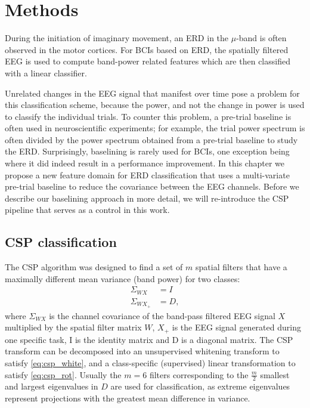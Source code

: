 \section{Methods}
During the initiation of imaginary movement, an \ac{ERD} in the $\mu$-band is
often observed in the motor cortices. For \acp{BCI} based on \ac{ERD}, the
spatially filtered \ac{EEG} is used to compute band-power related features
which are then classified with a linear classifier. 

\begin{sloppypar}
Unrelated changes in the \ac{EEG} signal that manifest over time pose a problem
for this classification scheme, because the power, and not the change in power
is used to classify the individual trials. To counter this problem, a pre-trial
baseline is often used in neuroscientific experiments; for
example, the trial power spectrum is often divided by the power spectrum
obtained from a pre-trial baseline to study the \ac{ERD}. Surprisingly,
baselining is rarely used for \acp{BCI}, one exception being
\cite{kronegg2007ebs} where it did indeed result in a performance improvement.
%
In this chapter we propose a new feature domain for \ac{ERD} classification
that uses a multi-variate pre-trial baseline to reduce the covariance between
the \ac{EEG} channels. Before we describe our baselining approach in more
detail, we will re-introduce the \ac{CSP} pipeline that serves as a control in
this work.
\end{sloppypar}

\subsection{CSP classification}\label{sec:CSP}
The \ac{CSP} algorithm  \cite{koles1991qet, ramoser2000osf} was designed to find
a set of $m$ spatial filters that have a maximally different mean variance
(band power) for two classes:
\begin{align}
  \Sigma_{WX} &= I \label{eq:csp_white}\\
  \Sigma_{WX_+} &= D \label{eq:csp_rot},
\end{align}
where $\Sigma_{WX}$ is the channel covariance of the band-pass filtered
\ac{EEG} signal $X$ multiplied by the spatial filter matrix $W$, $X_+$ is the
\ac{EEG} signal generated during one specific task, I is the identity matrix and
D is a diagonal matrix. The \ac{CSP} transform can be decomposed into an
unsupervised whitening transform to satisfy \eqref{eq:csp_white}, and a
class-specific (supervised) linear transformation to satisfy
\eqref{eq:csp_rot}. Usually the $m=6$ filters corresponding to the
$\frac{m}{2}$ smallest and largest eigenvalues in $D$ are used for
classification, as extreme eigenvalues represent projections with the greatest
mean difference in variance.

